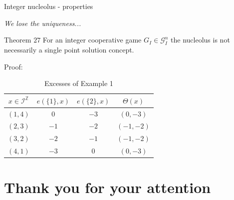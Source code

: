 \documentclass{beamer}
\newcommand{\Z}{\mathbb{Z}}
\begin{document}
\begin{frame}{Integer nucleolus - properties}

    \textit{We lose the uniqueness...}

    \begin{block}{Theorem $27$}
        For an integer cooperative game $G_I \in \mathcal{G}_I^n$ the nucleolus is not necessarily a single point solution concept.
    \end{block}
    Proof:

\begin{table}[h]
    \caption{Excesses of Example 1}
    \label{fig:excesses_of_weber_set_example}
    \centering
    \begin{tabular}{|c||c|c||c|}
        \hline
        $x \in \mathcal{I}^{\Z}$ &  $e(\{1\}, x)$ & $e(\{2\},x)$ & $\Theta(x)$\\
        \hline
        \hline
        $(1,4)$ & $0$ & $-3$ & $(0,-3)$ \\
        $(2,3)$ & $-1$ & $-2$ & $(-1,-2)$ \\
        $(3,2)$ & $-2$ & $-1$ & $(-1,-2)$ \\
        $(4,1)$ & $-3$ & $0$ & $(0,-3)$ \\
        \hline
    \end{tabular}
\end{table}
\end{frame}




\section{Thank you for your attention}
\end{document}
